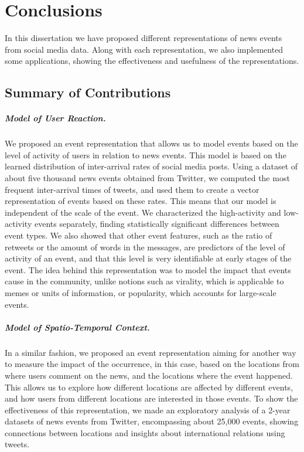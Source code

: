 \chapter{Conclusions}

In this dissertation we have proposed different representations of news events
from social media data.
%
Along with each representation, we also implemented some applications, showing
the effectiveness and usefulness of the representations.

\section{Summary of Contributions}

\paragraph{Model of User Reaction.}
%
We proposed an event representation that allows us to model events based on the
level of activity of users in relation to news events. 
%
This model is based on the learned distribution of inter-arrival rates of social
media posts.
%
Using a dataset of about five thousand news events obtained from Twitter, we
computed the most frequent inter-arrival times of tweets, and used them to create
a vector representation of events based on these rates.
%
This means that our model is independent of the scale of the event.
%
We characterized the high-activity and low-activity events separately, finding
statistically significant differences between event types.
%
We also showed that other event features, such as the ratio of retweets or the
amount of words in the messages, are predictors of the level of activity of an
event, and that this level is very identifiable at early stages of the event.
%
The idea behind this representation was to model the impact that events cause in
the community, unlike notions such as virality, which is applicable to memes or
units of information, or popularity, which accounts for large-scale events.

\paragraph{Model of Spatio-Temporal Context.}
%
In a similar fashion, we proposed an event representation aiming for another way
to measure the impact of the occurrence, in this case, based on the locations
from where users comment on the news, and the locations where the event
happened.
%
This allows us to explore how different locations are affected by different
events, and how users from different locations are interested in those events.
%
To show the effectiveness of this representation, we made an exploratory
analysis of a 2-year datasets of news events from Twitter, encompassing about
25,000 events, showing connections between locations and insights about
international relations using tweets.

